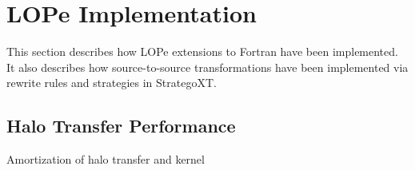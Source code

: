 \section{LOPe Implementation}

This section describes how LOPe extensions to Fortran have been implemented.  It also describes how
source-to-source transformations have been implemented via rewrite rules and strategies in
StrategoXT.

\subsection{Halo Transfer Performance}

Amortization of halo transfer and kernel


